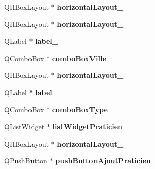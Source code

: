 \begin{DoxyCompactItemize}
\item 
\hypertarget{classUi__MainWindow_a8ead8fc876ee91c30864822eedb9c370}{Q\-H\-Box\-Layout $\ast$ {\bfseries horizontal\-Layout\-\_}}\label{classUi__MainWindow_a8ead8fc876ee91c30864822eedb9c370}

\item 
\hypertarget{classUi__MainWindow_ae183387a7d233b437a637b403ba39ffd}{Q\-H\-Box\-Layout $\ast$ {\bfseries horizontal\-Layout\-\_}}\label{classUi__MainWindow_ae183387a7d233b437a637b403ba39ffd}

\item 
\hypertarget{classUi__MainWindow_a78c7e10730b43c6700cd7216911ed76a}{Q\-Label $\ast$ {\bfseries label\-\_}}\label{classUi__MainWindow_a78c7e10730b43c6700cd7216911ed76a}

\item 
\hypertarget{classUi__MainWindow_a0622c68d3396a7bf6c350a2b436da014}{Q\-Combo\-Box $\ast$ {\bfseries combo\-Box\-Ville}}\label{classUi__MainWindow_a0622c68d3396a7bf6c350a2b436da014}

\item 
\hypertarget{classUi__MainWindow_a2afb915e1492b7e6704db4918c1e5e80}{Q\-H\-Box\-Layout $\ast$ {\bfseries horizontal\-Layout\-\_}}\label{classUi__MainWindow_a2afb915e1492b7e6704db4918c1e5e80}

\item 
\hypertarget{classUi__MainWindow_ad9c89133780f28e6efa2ec17ceb9cff5}{Q\-Label $\ast$ {\bfseries label}}\label{classUi__MainWindow_ad9c89133780f28e6efa2ec17ceb9cff5}

\item 
\hypertarget{classUi__MainWindow_a8864cf9be266b0de14c7f1da90376c77}{Q\-Combo\-Box $\ast$ {\bfseries combo\-Box\-Type}}\label{classUi__MainWindow_a8864cf9be266b0de14c7f1da90376c77}

\item 
\hypertarget{classUi__MainWindow_a416699fb8ee351e3970d47a6aee6a86f}{Q\-List\-Widget $\ast$ {\bfseries list\-Widget\-Praticien}}\label{classUi__MainWindow_a416699fb8ee351e3970d47a6aee6a86f}

\item 
\hypertarget{classUi__MainWindow_a03ce63974cc69b067c91bbf285cceca8}{Q\-H\-Box\-Layout $\ast$ {\bfseries horizontal\-Layout\-\_}}\label{classUi__MainWindow_a03ce63974cc69b067c91bbf285cceca8}

\item 
\hypertarget{classUi__MainWindow_ac3f16a152c2843e7dd421f7c4a25d64d}{Q\-Push\-Button $\ast$ {\bfseries push\-Button\-Ajout\-Praticien}}\label{classUi__MainWindow_ac3f16a152c2843e7dd421f7c4a25d64d}


\end{DoxyCompactItemize}
